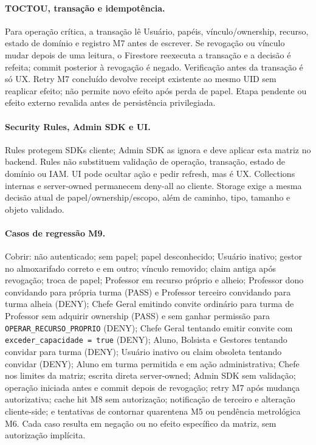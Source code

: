 \paragraph{TOCTOU, transação e idempotência.}
Para operação crítica, a transação lê Usuário, papéis, vínculo/ownership,
recurso, estado de domínio e registro M7 antes de escrever. Se revogação ou
vínculo mudar depois de uma leitura, o Firestore reexecuta a transação e a
decisão é refeita; commit posterior à revogação é negado. Verificação antes da
transação é só UX. Retry M7 concluído devolve receipt existente ao mesmo UID
sem reaplicar efeito; não permite novo efeito após perda de papel. Etapa
pendente ou efeito externo revalida antes de persistência privilegiada.

\paragraph{Security Rules, Admin SDK e UI.}
Rules protegem SDKs cliente; Admin SDK as ignora e deve aplicar esta matriz no
backend. Rules não substituem validação de operação, transação, estado de
domínio ou IAM. UI pode ocultar ação e pedir refresh, mas é UX. Collections
internas e server-owned permanecem deny-all ao cliente. Storage exige a mesma
decisão atual de papel/ownership/escopo, além de caminho, tipo, tamanho e
objeto validado.

\paragraph{Casos de regressão M9.}
Cobrir: não autenticado; sem papel; papel desconhecido; Usuário inativo;
gestor no almoxarifado correto e em outro; vínculo removido; claim antiga após
revogação; troca de papel; Professor em recurso próprio e alheio; Professor dono
convidando para própria turma (PASS) e Professor terceiro convidando para turma
alheia (DENY); Chefe Geral emitindo convite ordinário para turma de Professor sem
adquirir ownership (PASS) e sem ganhar permissão para \texttt{OPERAR\_RECURSO\_PROPRIO}
(DENY); Chefe Geral tentando emitir convite com \texttt{exceder\_capacidade = true} (DENY);
Aluno, Bolsista e Gestores tentando convidar para turma (DENY); Usuário inativo ou
claim obsoleta tentando convidar (DENY); Aluno em turma permitida e em ação
administrativa; Chefe nos limites da matriz; escrita direta server-owned;
Admin SDK sem validação; operação iniciada antes e commit depois de revogação;
retry M7 após mudança autorizativa; cache hit M8 sem autorização; notificação de
terceiro e alteração cliente-side; e tentativas de contornar quarentena M5 ou
pendência metrológica M6. Cada caso resulta em negação ou no efeito específico da
matriz, sem autorização implícita.
